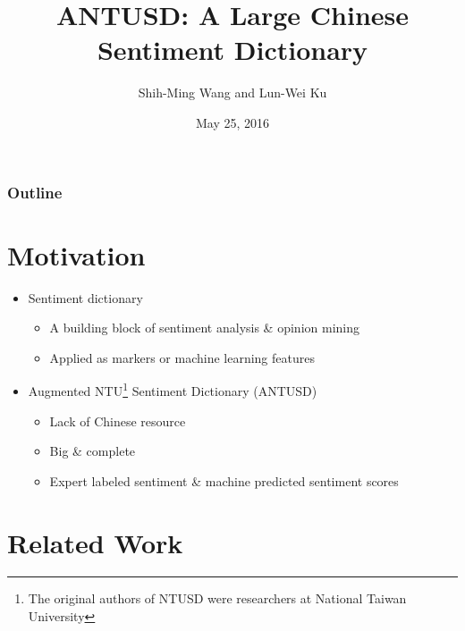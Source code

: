 \documentclass[compress]{beamer}
\title{ANTUSD: A Large Chinese Sentiment Dictionary }
\author{Shih-Ming Wang and Lun-Wei Ku}
\institute{NLPLab, Institute of Information Science, Academia Sinica}
\date{May 25, 2016}
\begin{document}
\beamertemplatenavigationsymbolsempty

\begin{frame}
    \maketitle
\end{frame}

\begin{frame}
    \frametitle{Outline}
    \tableofcontents
\end{frame}
\section{Motivation}
    \begin{frame}{\secname}
        \begin{itemize}
            \item Sentiment dictionary
            \begin{itemize}
                \item A building block of sentiment analysis \& opinion mining
                \item Applied as markers or machine learning features
            \end{itemize}
            \item Augmented NTU\footnote{The original authors of NTUSD were researchers at National Taiwan University} Sentiment Dictionary (ANTUSD)
            \begin{itemize}
                \item Lack of Chinese resource
                \item Big \& complete
                \item Expert labeled sentiment \& machine predicted sentiment scores
            \end{itemize}
        \end{itemize}
    \end{frame}


\section{Related Work}
\end{document}
